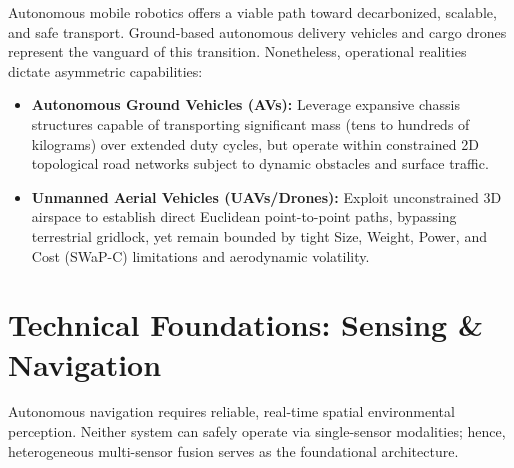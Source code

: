 \documentclass[conference,10pt]{IEEEtran}
\begin{document}
Autonomous mobile robotics offers a viable path toward decarbonized, scalable, and safe transport. Ground-based autonomous delivery vehicles and cargo drones represent the vanguard of this transition. Nonetheless, operational realities dictate asymmetric capabilities:
\begin{itemize}
    \item \textbf{Autonomous Ground Vehicles (AVs):} Leverage expansive chassis structures capable of transporting significant mass (tens to hundreds of kilograms) over extended duty cycles, but operate within constrained 2D topological road networks subject to dynamic obstacles and surface traffic.
    \item \textbf{Unmanned Aerial Vehicles (UAVs/Drones):} Exploit unconstrained 3D airspace to establish direct Euclidean point-to-point paths, bypassing terrestrial gridlock, yet remain bounded by tight Size, Weight, Power, and Cost (SWaP-C) limitations and aerodynamic volatility.
\end{itemize}

\section{Technical Foundations: Sensing \& Navigation}
Autonomous navigation requires reliable, real-time spatial environmental perception. Neither system can safely operate via single-sensor modalities; hence, heterogeneous multi-sensor fusion serves as the foundational architecture.
\end{document}
